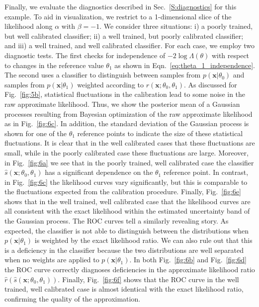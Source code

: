 \documentclass[12pt]{article}
\numberwithin{equation}{section}
\theoremstyle{plain}
\begin{document}
Finally, we evaluate the diagnostics described in Sec.~\ref{S:diagnostics} for
this example. To aid in visualization, we restrict to a 1-dimensional slice of
the likelihood along $\alpha$ with $\beta=-1$.   We consider three situations: i)
a poorly trained, but well calibrated classifier; ii) a well trained, but poorly
calibrated classifier; and iii) a well trained, and well calibrated classifier.
For each case, we employ two diagnostic tests. The first checks for independence
of $-2\log\Lambda(\theta)$ with respect to changes in the reference value
$\theta_1$ as shown in Eqn.~\ref{eq:theta_1_independence}. The second uses a
classifier to distinguish between samples from  $p(\mathbf{x}|\theta_0)$ and
samples from $p(\mathbf{x}|\theta_1)$ weighted according to $r(\mathbf{x};
\theta_0, \theta_1)$.  As discussed for Fig.~\ref{fig:5b}, statistical
fluctuations in the calibration lead to some noise in the raw approximate
likelihood. Thus, we show the posterior mean of a Gaussian processes resulting
from Bayesian optimization of  the raw approximate likelihood as in
Fig.~\ref{fig:6c}. In addition, the standard deviation of the Gaussian process
is shown for one of the $\theta_1$ reference points to indicate the size of
these statistical fluctuations. It is clear that in the well calibrated cases
that these fluctuations are small, while in the poorly calibrated case these
fluctuations are large. Moreover, in Fig.~\ref{fig:6a} we see that in the poorly
trained, well calibrated case the classifier $\hat{s}(\mathbf{x}; \theta_0,
\theta_1)$ has a significant dependence on the $\theta_1$ reference point. In
contrast, in Fig.~\ref{fig:6c} the likelihood curves vary significantly, but
this is comparable to the fluctuations expected from the calibration procedure.
Finally, Fig.~\ref{fig:6e} shows that in the well trained, well calibrated case
that the likelihood curves are all consistent with the exact likelihood within
the estimated uncertainty band of the Gaussian process.  The ROC curves tell a
similarly revealing story. As expected, the classifier is not able to
distinguish between the distributions when $p(\mathbf{x}|\theta_1)$ is weighted
by the exact likelihood ratio. We can also rule out that this is a deficiency in
the classifier because the two distributions are well separated when no weights
are applied to $p(\mathbf{x}|\theta_1)$. In both Fig.~\ref{fig:6b} and
Fig.~\ref{fig:6d} the ROC curve correctly diagnoses deficiencies in the
approximate likelihood ratio  $\hat{r}(\hat{s}(\mathbf{x}; \theta_0,
\theta_1))$. Finally, Fig.~\ref{fig:6f} shows that the ROC curve in the well
trained, well calibrated case is almost identical with the exact likelihood
ratio, confirming the quality of the approximation.
\end{document}
